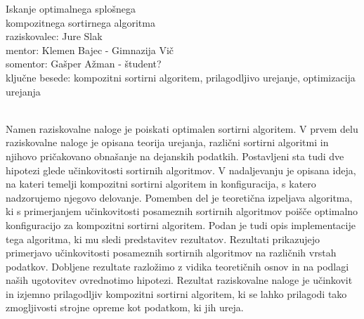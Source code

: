 \documentclass[a4paper,oneside,12pt]{article}
\begin{document}
\begin{center}
  {\huge Iskanje optimalnega splošnega \\ kompozitnega sortirnega algoritma} \\[10mm]
 raziskovalec: Jure Slak \\[5mm]
 mentor: Klemen Bajec - Gimnazija Vič \\[3mm]
 somentor: Gašper Ažman - študent?  \\[5mm]
 ključne besede: kompozitni sortirni algoritem, prilagodljivo urejanje, optimizacija urejanja \\[10mm]
\end{center} 

{ \\[4mm]}
Namen raziskovalne naloge je poiskati optimalen sortirni algoritem.
V prvem delu raziskovalne naloge je opisana teorija urejanja, različni sortirni
algoritmi in njihovo pričakovano obnašanje na dejanskih podatkih. Postavljeni sta tudi dve 
hipotezi glede učinkovitosti sortirnih algoritmov. 
V nadaljevanju je opisana ideja, na
kateri temelji kompozitni sortirni algoritem in konfiguracija, s katero nadzorujemo
njegovo delovanje. Pomemben del je teoretična izpeljava
algoritma, ki s primerjanjem učinkovitosti posameznih sortirnih algoritmov poišče
optimalno konfiguracijo za kompozitni sortirni algoritem. Podan je tudi opis 
implementacije tega algoritma, ki mu sledi 
predstavitev rezultatov. Rezultati prikazujejo primerjavo učinkovitosti posameznih 
sortirnih algoritmov na različnih vrstah podatkov. 
Dobljene rezultate razložimo z vidika teoretičnih osnov in na podlagi naših ugotovitev 
ovrednotimo hipotezi. Rezultat raziskovalne naloge je učinkovit in izjemno prilagodljiv
kompozitni sortirni algoritem, ki se lahko prilagodi tako zmogljivosti strojne opreme
kot podatkom, ki jih ureja.
\end{document}
